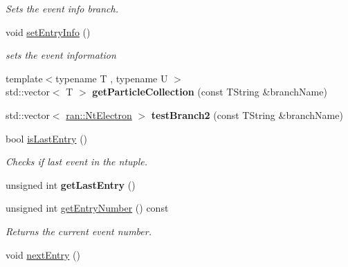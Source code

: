 \begin{DoxyCompactItemize}
\begin{DoxyCompactList}\small\item\em Sets the event info branch. \end{DoxyCompactList}\item 
\hypertarget{classNtpReader_a625467bc99cd81f63d4ef73c34bcf26c}{void \hyperlink{classNtpReader_a625467bc99cd81f63d4ef73c34bcf26c}{set\-Entry\-Info} ()}\label{classNtpReader_a625467bc99cd81f63d4ef73c34bcf26c}

\begin{DoxyCompactList}\small\item\em sets the event information \end{DoxyCompactList}\item 
\hypertarget{classNtpReader_a34265ba45134f25e07088d0731890882}{{\footnotesize template$<$typename T , typename U $>$ }\\std\-::vector$<$ T $>$ {\bfseries get\-Particle\-Collection} (const T\-String \&branch\-Name)}\label{classNtpReader_a34265ba45134f25e07088d0731890882}

\item 
\hypertarget{classNtpReader_a8dd674f3e6f47cc330f80cb3012d73c0}{std\-::vector$<$ \hyperlink{classran_1_1NtElectron}{ran\-::\-Nt\-Electron} $>$ {\bfseries test\-Branch2} (const T\-String \&branch\-Name)}\label{classNtpReader_a8dd674f3e6f47cc330f80cb3012d73c0}

\item 
\hypertarget{classNtpReader_a22d356eb785288fd3f6b7505b1c0f4f1}{bool \hyperlink{classNtpReader_a22d356eb785288fd3f6b7505b1c0f4f1}{is\-Last\-Entry} ()}\label{classNtpReader_a22d356eb785288fd3f6b7505b1c0f4f1}

\begin{DoxyCompactList}\small\item\em Checks if last event in the ntuple. \end{DoxyCompactList}\item 
\hypertarget{classNtpReader_ac5efd42974d0c40ae189c8fafe3c0cdc}{unsigned int {\bfseries get\-Last\-Entry} ()}\label{classNtpReader_ac5efd42974d0c40ae189c8fafe3c0cdc}

\item 
\hypertarget{classNtpReader_aaee876d696eb198343478b2c191f1675}{unsigned int \hyperlink{classNtpReader_aaee876d696eb198343478b2c191f1675}{get\-Entry\-Number} () const }\label{classNtpReader_aaee876d696eb198343478b2c191f1675}

\begin{DoxyCompactList}\small\item\em Returns the current event number. \end{DoxyCompactList}\item 
\hypertarget{classNtpReader_a04ccaa20b936feab664f0c207c092de5}{void \hyperlink{classNtpReader_a04ccaa20b936feab664f0c207c092de5}{next\-Entry} ()}\label{classNtpReader_a04ccaa20b936feab664f0c207c092de5}


\end{DoxyCompactItemize}
